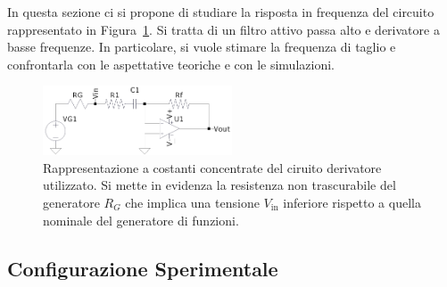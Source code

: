 \documentclass[a4paper,11pt]{article}
\begin{document}
In questa sezione ci si propone di studiare la risposta in frequenza del circuito
rappresentato in Figura~\ref{fig:circ_bode}. Si tratta di un filtro attivo passa alto e derivatore a basse
frequenze. In particolare, si vuole stimare la frequenza di taglio e confrontarla con le
aspettative teoriche e con le simulazioni.
\begin{figure}[h]
\centering
\includegraphics[width=0.5\textwidth]{images/circuit_bode}
\caption{\footnotesize Rappresentazione a costanti concentrate del ciruito
  derivatore utilizzato. Si mette in evidenza la resistenza non trascurabile del generatore $R_G$ che implica una tensione $V_{\text{in}}$ inferiore rispetto a quella nominale del generatore di funzioni.}\label{fig:circ_bode}
\end{figure}

\subsection{Configurazione Sperimentale}\label{sec:confspeDeriv}
\end{document}
